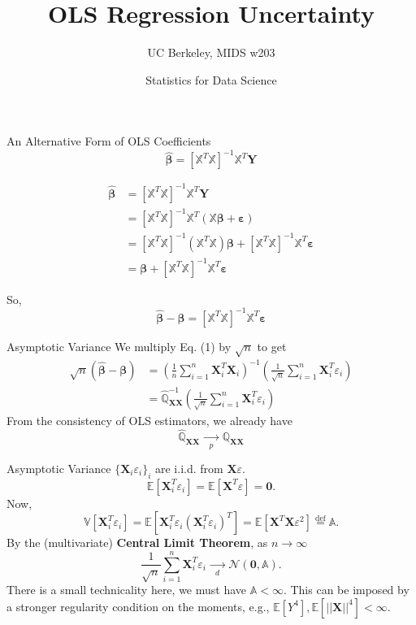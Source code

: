 \documentclass[12pt, block=fill]{beamer}
\title{OLS Regression Uncertainty}
\subtitle{UC Berkeley, MIDS w203}
\author{Statistics for Data Science}
\newcommand{\E}[1]{\mathbb{E}\left[#1\right]}
\renewcommand{\v}[1]{\pmb{#1}}
\newcommand{\m}[1]{\mathbb{#1}}
\newcommand{\eps}{\varepsilon}
\begin{document}
\maketitle

\begin{frame}{An Alternative Form of OLS Coefficients}
$$
\widehat{\v{\beta}}
=\left[\m{X}^T\m{X}\right]^{-1}\m{X}^T\v{Y} 
$$

$$
\begin{aligned}
\widehat{\v{\beta}}
&=\left[\m{X}^T\m{X}\right]^{-1}\m{X}^T\v{Y} \\
&=\left[\m{X}^T\m{X}\right]^{-1}\m{X}^T(\m{X}\v{\beta}+\v{\eps}) \\
&=\left[\m{X}^T\m{X}\right]^{-1}(\m{X}^T\m{X})\v{\beta}+
\left[\m{X}^T\m{X}\right]^{-1}\m{X}^T\v{\eps} \\
&=\v{\beta} + \left[\m{X}^T\m{X}\right]^{-1}\m{X}^T\v{\eps}
\end{aligned}
$$

So,
\begin{equation}
\widehat{\v{\beta}}-\v{\beta} = \left[\m{X}^T\m{X}\right]^{-1}\m{X}^T\v{\eps}
\end{equation}
\end{frame}

\begin{frame}{Asymptotic Variance}
We multiply Eq. (1) by $\sqrt{n}$ to get
$$
\begin{aligned}
\sqrt{n}\left(\widehat{\v{\beta}}-\v{\beta}\right)
&=\left( \frac{1}{n}\sum\limits_{i=1}^n\v{X}_i^T\v{X}_i \right)^{-1}
\left( \frac{1}{\sqrt{n}}\sum\limits_{i=1}^n\v{X}_i^T\eps_i \right) \\
&=\widehat{\m Q}_{\v{XX}}^{-1}
\left( \frac{1}{\sqrt{n}}\sum\limits_{i=1}^n\v{X}_i^T\eps_i \right)
\end{aligned}
$$
From the consistency of OLS estimators, we already have 
$$ \widehat{\m Q}_{\v{XX}}\xrightarrow[p]{\quad\quad}\m{Q}_{\v{XX}}$$
\end{frame}

\begin{frame}{Asymptotic Variance}
$\{\v{X}_i\eps_i\}_i$ are i.i.d. from $\v{X}\eps$. 
$$
\E{\v{X}_i^T\eps_i}=\E{\v{X}^T\eps}=\v{0}.
$$
Now, 
$$
\m{V}[\v{X}_i^T\eps_i]=\E{\v{X}_i^T\eps_i\left(\v{X}_i^T\eps_i\right)^T}=\E{\v{X}^T\v{X}\eps^2}\stackrel{\text{def}}{=}\m{A}.
$$
By the (multivariate) \textbf{Central Limit Theorem}, as $n\to\infty$
$$
\frac{1}{\sqrt{n}}\sum\limits_{i=1}^n\v{X}_i^T\eps_i
\xrightarrow[d]{\quad\quad}\mathcal{N}(\v{0},\m{A}).
$$
There is a small technicality here, we must have $\m{A}<\infty$. This can be imposed by a stronger regularity condition on the moments, e.g.,
$\E{Y^4},\E{||\v{X}||^4}<\infty$.
\end{frame}
\end{document}
